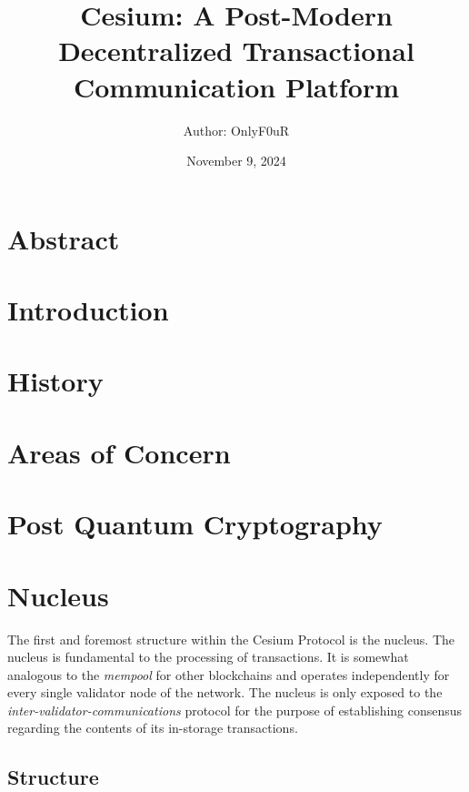\documentclass[letterpaper, 12pt]{article}
\title{Cesium: A Post-Modern Decentralized Transactional Communication Platform}
\author{\normalsize Author: OnlyF0uR\\\normalsize}
\date {\color{black} November 9, 2024}
\begin{document}
\maketitle

\section{Abstract}

\lipsum[1]

\section{Introduction}

\lipsum[1]

\section{History}

\lipsum[1-2]

\section{Areas of Concern}
    
\lipsum[1-3]

\section{Post Quantum Cryptography}

\lipsum[1] 
    
\section{Nucleus}

The first and foremost structure within the Cesium Protocol is the nucleus. The nucleus is fundamental to the processing of transactions. It is somewhat analogous to the \textit{mempool} for other blockchains and operates independently for every single validator node of the network. The nucleus is only exposed to the \textit{inter-validator-communications} protocol for the purpose of establishing consensus regarding the contents of its in-storage transactions.

\subsection{Structure}
\end{document}
